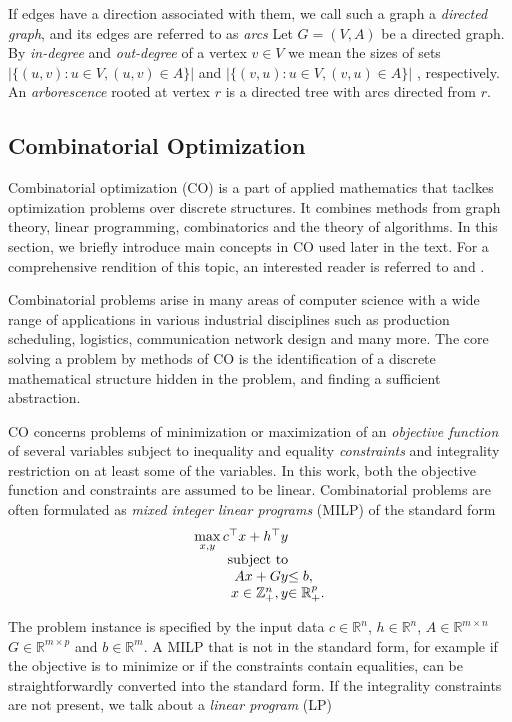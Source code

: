 If edges have a direction associated with them, we call such a graph a \emph{directed graph}, and its edges are referred to as \emph{arcs}
Let $G=(V,A)$ be a directed graph. 
By \emph{in-degree} and \emph{out-degree} of a vertex $v\in V$ we mean the sizes of sets $|\{(u,v): u\in V, (u,v) \in A\}|$ and $|\{(v,u): u\in V, (v,u) \in A\}|$ , respectively.
An \emph{arborescence} rooted at vertex $r$ is a directed tree with arcs directed from $r$.

\subsection{Combinatorial Optimization}

Combinatorial optimization (CO) is a part of applied mathematics that taclkes optimization problems over discrete structures.
It combines methods from graph theory, linear programming, combinatorics and the theory of algorithms.
In this section, we briefly introduce main concepts in CO used later in the text.
For a comprehensive rendition of this topic, an interested reader is referred to \cite{wolsey98} and \cite{nemhauser88}.

Combinatorial problems arise in many areas of computer science with a wide range of applications in various industrial disciplines 
such as production scheduling, logistics, communication network design and many more.
The core solving a problem by methods of CO is the identification of a discrete mathematical structure hidden in the problem,
and finding a sufficient abstraction.

CO concerns problems of minimization or maximization of an \emph{objective function} of several variables 
subject to inequality and equality \emph{constraints} and integrality restriction on at least some of the variables.
In this work, both the objective function and constraints are assumed to be linear.
Combinatorial problems are often formulated as \emph{mixed integer linear programs} (MILP) of the standard form
\begin{equation}
\begin{array}{r@{}l}
	\max\limits_{x,y}c^\top x + h^\top y & \\
	\text{subject to}& \\
	  Ax + Gy &\leq b, \\
	  x \in \mathbb{Z}^{n}_+, y & \in\mathbb{R}^{p}_+. 
\end{array}
\end{equation}

The problem instance is specified by the input data $c\in \mathbb{R}^n$, $h \in \mathbb{R}^n$, $A \in \mathbb{R}^{m\times n}$  $G \in\mathbb{R}^{m\times p}$ and $b \in \mathbb{R}^m$.
A MILP that is not in the standard form, for example if the objective is to minimize or if the constraints contain equalities, can be straightforwardly converted into the standard form.
If the integrality constraints are not present, we talk about a \emph{linear program} (LP)


